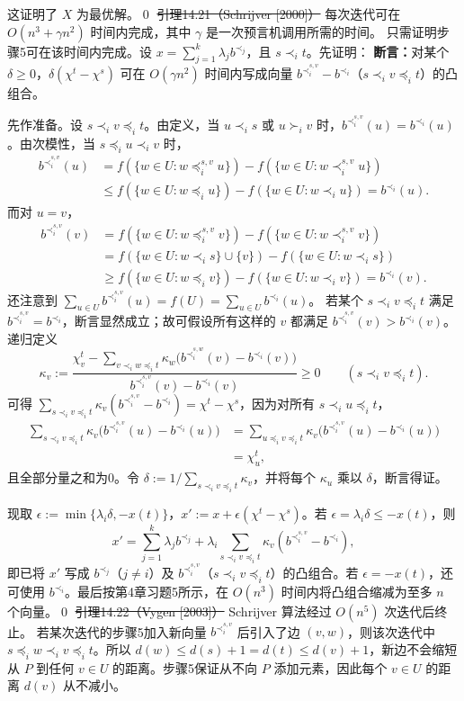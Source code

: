 这证明了 $X$ 为最优解。\qed
\st{引理14.21（Schrijver [2000]）} 每次迭代可在 $O(n^3+\gamma n^2)$ 时间内完成，其中 $\gamma$ 是一次预言机调用所需的时间。
\pr 只需证明步骤5可在该时间内完成。设 $x=\sum_{j=1}^k\lambda_jb^{\prec_j}$，且 $s\prec_i t$。先证明：
\textbf{断言：}对某个 $\delta\ge0$，$\delta(\chi^t-\chi^s)$ 可在 $O(\gamma n^2)$ 时间内写成向量 $b^{\prec_i^{s,v}}-b^{\prec_i}$（$s\prec_i v\preceq_i t$）的凸组合。

先作准备。设 $s\prec_i v\preceq_i t$。由定义，当 $u\prec_i s$ 或 $u\succ_i v$ 时，$b^{\prec_i^{s,v}}(u)=b^{\prec_i}(u)$。由次模性，当 $s\preceq_i u\prec_i v$ 时，
\begin{align*}
b^{\prec_i^{s,v}}(u)
&=f(\{w\in U:w\preceq_i^{s,v}u\})-f(\{w\in U:w\prec_i^{s,v}u\})\\
&\le f(\{w\in U:w\preceq_i u\})-f(\{w\in U:w\prec_i u\})=b^{\prec_i}(u).
\end{align*}
而对 $u=v$，
\begin{align*}
b^{\prec_i^{s,v}}(v)
&=f(\{w\in U:w\preceq_i^{s,v}v\})-f(\{w\in U:w\prec_i^{s,v}v\})\\
&=f(\{w\in U:w\prec_i s\}\cup\{v\})-f(\{w\in U:w\prec_i s\})\\
&\ge f(\{w\in U:w\preceq_i v\})-f(\{w\in U:w\prec_i v\})=b^{\prec_i}(v).
\end{align*}
还注意到 $\sum_{u\in U}b^{\prec_i^{s,v}}(u)=f(U)=\sum_{u\in U}b^{\prec_i}(u)$。
若某个 $s\prec_i v\preceq_i t$ 满足 $b^{\prec_i^{s,v}}=b^{\prec_i}$，断言显然成立；故可假设所有这样的 $v$ 都满足 $b^{\prec_i^{s,v}}(v)>b^{\prec_i}(v)$。递归定义
\[\kappa_v:=\frac{\chi^t_v-\sum_{v\prec_i w\preceq_i t}\kappa_w\bigl(b^{\prec_i^{s,w}}(v)-b^{\prec_i}(v)\bigr)}{b^{\prec_i^{s,v}}(v)-b^{\prec_i}(v)}\ge0
\qquad(s\prec_i v\preceq_i t).\]
可得 $\sum_{s\prec_i v\preceq_i t}\kappa_v(b^{\prec_i^{s,v}}-b^{\prec_i})=\chi^t-\chi^s$，因为对所有 $s\prec_i u\preceq_i t$，
\begin{align*}
\sum_{s\prec_i v\preceq_i t}\kappa_v\bigl(b^{\prec_i^{s,v}}(u)-b^{\prec_i}(u)\bigr)
&=\sum_{u\preceq_i v\preceq_i t}\kappa_v\bigl(b^{\prec_i^{s,v}}(u)-b^{\prec_i}(u)\bigr)\\
&=\chi^t_u,
\end{align*}
且全部分量之和为0。令 $\delta:=1/\sum_{s\prec_i v\preceq_i t}\kappa_v$，并将每个 $\kappa_u$ 乘以 $\delta$，断言得证。

现取 $\epsilon:=\min\{\lambda_i\delta,-x(t)\}$，$x':=x+\epsilon(\chi^t-\chi^s)$。若 $\epsilon=\lambda_i\delta\le-x(t)$，则
\[x'=\sum_{j=1}^k\lambda_jb^{\prec_j}+\lambda_i\sum_{s\prec_i v\preceq_i t}\kappa_v(b^{\prec_i^{s,v}}-b^{\prec_i}),\]
即已将 $x'$ 写成 $b^{\prec_j}$（$j\ne i$）及 $b^{\prec_i^{s,v}}$（$s\prec_i v\preceq_i t$）的凸组合。若 $\epsilon=-x(t)$，还可使用 $b^{\prec_i}$。最后按第4章习题5所示，在 $O(n^3)$ 时间内将凸组合缩减为至多 $n$ 个向量。\qed
\st{引理14.22（Vygen [2003]）} Schrijver 算法经过 $O(n^5)$ 次迭代后终止。
\pr 若某次迭代的步骤5加入新向量 $b^{\prec_i^{s,v}}$ 后引入了边 $(v,w)$，则该次迭代中 $s\preceq_i w\prec_i v\preceq_i t$。所以 $d(w)\le d(s)+1=d(t)\le d(v)+1$，新边不会缩短从 $P$ 到任何 $v\in U$ 的距离。步骤5保证从不向 $P$ 添加元素，因此每个 $v\in U$ 的距离 $d(v)$ 从不减小。

